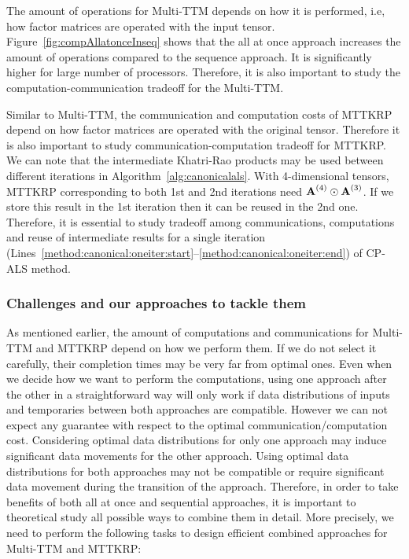 \documentclass[a4paper,11pt]{article}
\begin{document}
	
	
	
	The amount of operations for Multi-TTM depends on how it is performed, i.e, how factor matrices are operated with the input tensor. Figure~\ref{fig:compAllatonceInseq} shows that the all at once approach increases the amount of operations compared to the sequence approach. It is significantly higher for large number of processors. Therefore, it is also important to study the computation-communication tradeoff for the Multi-TTM. 
	
	
	
%	
	
	Similar to Multi-TTM, the communication and computation costs of  MTTKRP  depend on how factor matrices are operated with the original tensor. Therefore it is also important to study communication-computation tradeoff for MTTKRP. We can note that the intermediate Khatri-Rao products may be used between different iterations in Algorithm~\ref{alg:canonicalals}. With 4-dimensional tensors, MTTKRP corresponding to both 1st and 2nd iterations need $\Mn{A}{4}\odot\Mn{A}{3}$. If we store this result in the 1st iteration then it can be reused in the 2nd one. Therefore, it is essential to study tradeoff among communications, computations and reuse of intermediate results for a single iteration (Lines~\ref{method:canonical:oneiter:start}--\ref{method:canonical:oneiter:end}) of CP-ALS method.
	
	
	
	\subsubsection{Challenges and our approaches to tackle them}
	
	As mentioned earlier, the amount of computations and communications for Multi-TTM and MTTKRP  depend on how we perform them. If we do not select it carefully, their completion times may be very far from optimal ones. Even when we decide how we want to perform the computations,  using one approach after the other in a straightforward way will only work if data distributions of inputs and temporaries between both approaches are compatible. However we can not expect any guarantee with respect to the optimal communication/computation cost.  Considering optimal data distributions for only one approach may induce significant data movements  for the other approach. Using optimal data distributions for both approaches may not be compatible or require significant data movement during the transition of the approach. Therefore, in order to take benefits of both all at once and sequential approaches, it is important to theoretical study all possible ways to combine them in detail. More precisely, we need to perform the following tasks to design efficient combined approaches for Multi-TTM and MTTKRP:
	
\end{document}
